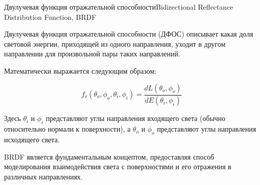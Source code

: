 \documentclass{beamer}
\begin{document}
	\begin{frame}{Двулучевая функция отражательной способности}{Bidirectional Reflectance Distribution Function, BRDF}
		
		Двулучевая функция отражательной способности (ДФОС) описывает какая доля световой энергии, приходящей из одного направления, уходит в другом направлении для произвольной пары таких направлений. 
		
		Математически выражается следующим образом:

		\[
			f_r
			(\theta_o, \phi_o, \theta_i, \phi_i) =
			\frac{d L(\theta_o, \phi_o)}{d E (\theta_i, \phi_i)}
		\]


		Здесь \(\theta_i\) и \(\phi_i\) представляют углы направления входящего света (обычно относительно нормали к поверхности), а \(\theta_o\) и \(\phi_o\) представляют углы направления исходящего света. 

		BRDF является фундаментальным концептом,
		предоставляя способ моделирования взаимодействия света с поверхностями и его отражения в различных направлениях.

	\end{frame}
\end{document}
